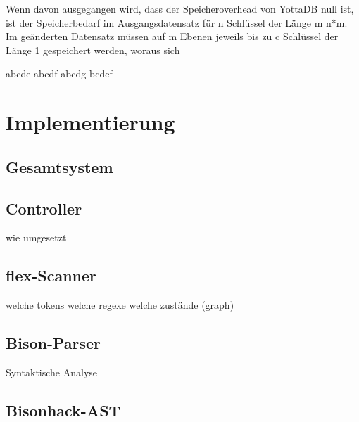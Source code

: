 \documentclass[oneside]{ausarbeitung}
\begin{document}
	
	
	Wenn davon ausgegangen wird, dass der Speicheroverhead von YottaDB null ist, ist der Speicherbedarf im Ausgangsdatensatz für n Schlüssel der Länge m n*m. Im geänderten Datensatz müssen auf m Ebenen jeweils bis zu c Schlüssel der Länge 1 gespeichert werden, woraus sich 
	
	
	abcde
	abcdf
	abcdg
	bcdef
	
	
	
	
	
	
	
	
	\chapter{Implementierung}
	\label{chapt_implementierung}
	
	\section{Gesamtsystem}
	
	\section{Controller}
	wie umgesetzt
	
	\section{flex-Scanner}
	welche tokens
	welche regexe
	welche zustände (graph)
	
		
	\section{Bison-Parser}
	Syntaktische Analyse
	
	\section{Bisonhack-AST}
\end{document}
